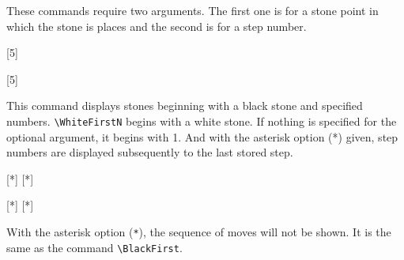 \documentclass[a4paper]{oblivoir}
\begin{document}
\begin{boxedverbatim}
\end{boxedverbatim}

\begin{ksbadukpan}[badukpansize=7,badukpancolor=yellow!20][DL]
\end{ksbadukpan}

These commands require two arguments. The first one is for a stone point in which the stone is places and the second is for a step number.

\begin{boxedverbatim}
[5]
\end{boxedverbatim}

\begin{ksbadukpan}[badukpansize=7,badukpancolor=yellow!20][DL]
[5]
\end{ksbadukpan}

This command displays stones beginning with a black stone and specified numbers.
\verb|\WhiteFirstN| begins with a white stone.
If nothing is specified for the optional argument, it begins with 1.
And with the asterisk option (*) given, step numbers are displayed subsequently to the last stored step.

\begin{boxedverbatim}
[*]
[*]
\end{boxedverbatim}

\begin{ksbadukpan}[badukpansize=7,badukpancolor=yellow!20,posmark][UR]
[*]
[*]
\end{ksbadukpan}

\medskip

With the asterisk option (\verb|*|), the sequence of moves will not be shown.
It is the same as the command \verb|\BlackFirst|.

\begin{boxedverbatim}
\end{boxedverbatim}
\end{document}

